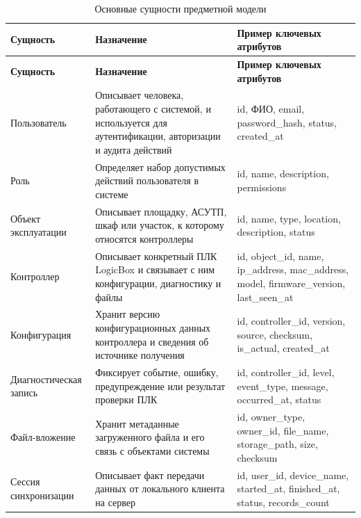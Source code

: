 \small
\begin{longtable}{|p{}|p{}|p{}|}
    \caption{Основные сущности предметной модели} \label{tab:entities} \\
    \hline
    \textbf{Сущность} & \textbf{Назначение} & \textbf{Пример ключевых атрибутов} \\ \hline
    \endfirsthead

    \tabcont{\ref{tab:entities}}
    \textbf{Сущность} & \textbf{Назначение} & \textbf{Пример ключевых атрибутов} \\ \hline
    \endhead

    \hline
    \endfoot

    \hline
    \endlastfoot

    Пользователь & Описывает человека, работающего с системой, и используется для аутентификации, авторизации и аудита действий & id, ФИО, email, password\_hash, status, created\_at \\ \hline
    Роль & Определяет набор допустимых действий пользователя в системе & id, name, description, permissions \\ \hline
    Объект эксплуатации & Описывает площадку, АСУТП, шкаф или участок, к которому относятся контроллеры & id, name, type, location, description, status \\ \hline
    Контроллер & Описывает конкретный ПЛК LogicBox и связывает с ним конфигурации, диагностику и файлы & id, object\_id, name, ip\_address, mac\_address, model, firmware\_version, last\_seen\_at \\ \hline
    Конфигурация & Хранит версию конфигурационных данных контроллера и сведения об источнике получения & id, controller\_id, version, source, checksum, is\_actual, created\_at \\ \hline
    Диагностическая запись & Фиксирует событие, ошибку, предупреждение или результат проверки ПЛК & id, controller\_id, level, event\_type, message, occurred\_at, status \\ \hline
    Файл-вложение & Хранит метаданные загруженного файла и его связь с объектами системы & id, owner\_type, owner\_id, file\_name, storage\_path, size, checksum \\ \hline
    Сессия синхронизации & Описывает факт передачи данных от локального клиента на сервер & id, user\_id, device\_name, started\_at, finished\_at, status, records\_count \\ \hline
\end{longtable}
\normalsize

